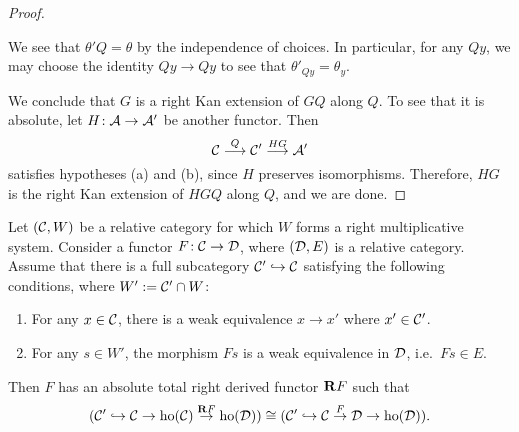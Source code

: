 \begin{proof}
\begin{enumerate}[label=(\arabic*)]
We see that \(\theta'Q = \theta\) by the independence of choices. In particular, for any \(Qy\), we may choose the identity \(Qy \to Qy\) to see that \(\theta'_{Qy} = \theta_y\).
\end{enumerate}
We conclude that \(G\) is a right Kan extension of \(GQ\) along \(Q\). To see that it is absolute, let \(H\!:\mathcal{A}\to\mathcal{A}'\) be another functor. Then
\[ \mathcal{C}\overset{Q}{\longrightarrow}\mathcal{C}'\overset{HG}{\longrightarrow}\mathcal{A}' \]
satisfies hypotheses (a) and (b), since \(H\) preserves isomorphisms. Therefore, \(HG\) is the right Kan extension of \(HGQ\) along \(Q\), and we are done.
\end{proof}

\begin{theorem}\label{thm:right-multiplicative-system-right-derived-functor-exists}
	Let \((\mathcal{C},W)\) be a relative category for which \(W\) forms a right multiplicative system. Consider a functor \(F\!:\mathcal{C}\to\mathcal{D}\), where \((\mathcal{D},E)\) is a relative category.
	Assume that there is a full subcategory \(\mathcal{C}'\hookrightarrow\mathcal{C}\) satisfying the following conditions, where \(W' := \mathcal{C}'\cap W\):
	\begin{enumerate}[label=(\alph*)]
	\item For any \(x\in\mathcal{C}\), there is a weak equivalence \(x\to x'\) where \(x'\in\mathcal{C}'\).
	\item For any \(s\in W'\), the morphism \(Fs\) is a weak equivalence in \(\mathcal{D}\), i.e.\ \(Fs\in E\).
	\end{enumerate}
	Then \(F\) has an absolute total right derived functor \(\mathbf{R} F\) such that
	\[ (\mathcal{C}'\hookrightarrow \mathcal{C} \to \operatorname{ho}(\mathcal{C}) \overset{\mathbf{R} F}\to \operatorname{ho}(\mathcal{D})) \cong (\mathcal{C}'\hookrightarrow\mathcal{C}\overset{F}\to\mathcal{D}\to\operatorname{ho}(\mathcal{D})). \]
\end{theorem}
